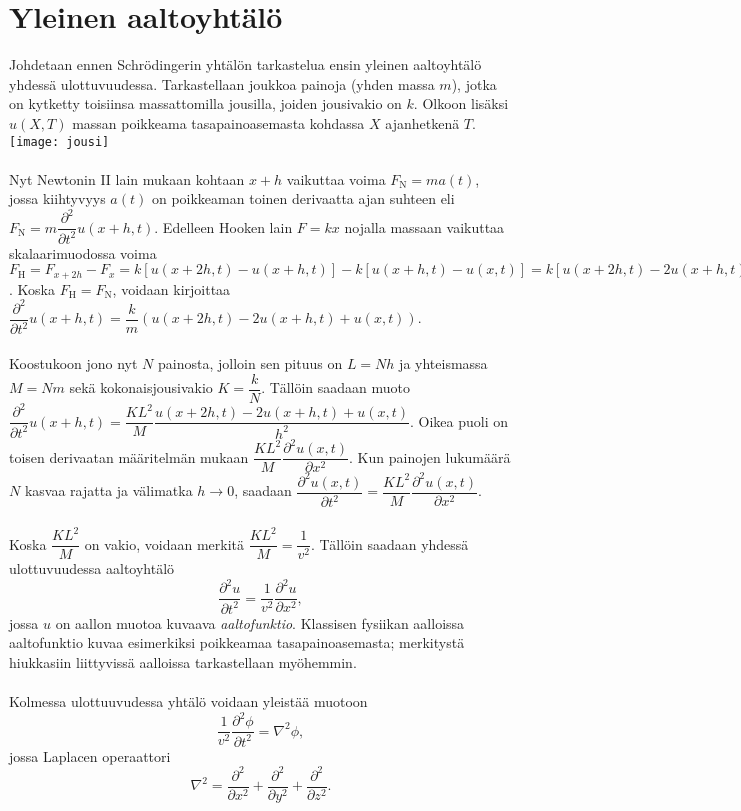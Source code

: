 \documentclass{article}
\begin{document}
\section{Yleinen aaltoyhtälö}
Johdetaan ennen Schrödingerin yhtälön tarkastelua ensin yleinen aaltoyhtälö yhdessä ulottuvuudessa. Tarkastellaan joukkoa painoja (yhden massa \(m\)), jotka on kytketty toisiinsa massattomilla jousilla, joiden jousivakio on \(k\). Olkoon lisäksi \(u(X, T)\) massan poikkeama tasapainoasemasta kohdassa \(X\) ajanhetkenä \(T\).\\
 \texttt{[image: jousi]}
 \\
 \\
Nyt Newtonin II lain mukaan kohtaan \(x+h\) vaikuttaa voima \(F_\text{N}=ma(t)\), jossa kiihtyvyys \(a(t)\) on poikkeaman toinen derivaatta ajan suhteen eli \(F_\text{N}=m\dfrac{\partial ^2}{\partial t^2} u(x+h, t)\). Edelleen Hooken lain \(F=kx\) nojalla massaan vaikuttaa skalaarimuodossa voima \(F_\text{H}=F_{x+2h}-F_x =k[u(x+2h, t)-u(x+h, t)]-k[u(x+h, t) - u(x, t)]=k[u(x+2h, t) - 2u(x+h, t) + u(x, t)]\). Koska \(F_\text{H}=F_\text{N}\), voidaan kirjoittaa \(\dfrac{\partial ^2}{\partial t^2}u(x+h, t)=\dfrac{k}{m}(u(x+2h, t)-2u(x+h, t)+u(x, t))\).\\
 \\
Koostukoon jono nyt \(N\) painosta, jolloin sen pituus on \(L=Nh\) ja yhteismassa \(M=Nm\) sekä kokonaisjousivakio \(K=\dfrac{k}{N}\). Tällöin saadaan muoto \(\dfrac{\partial ^2}{\partial t^2} u(x+h, t)=\dfrac{KL^2}{M} \dfrac{u(x+2h, t)-2u(x+h, t)+u(x, t)}{h^2}\). Oikea puoli on toisen derivaatan määritelmän mukaan \(\dfrac{KL^2}{M}\dfrac{\partial ^2 u(x, t)}{\partial x^2}\). Kun painojen lukumäärä \(N\) kasvaa rajatta ja välimatka \(h\to 0\), saadaan \(\dfrac{\partial ^2 u(x, t)}{\partial t^2}=\dfrac{KL^2}{M}\dfrac{\partial ^2 u(x, t)}{\partial x^2}\).\\
 \\
Koska \(\dfrac{KL^2}{M}\) on vakio, voidaan merkitä \(\dfrac{KL^2}{M}=\dfrac{1}{v^2}\). Tällöin saadaan yhdessä ulottuvuudessa aaltoyhtälö $$\dfrac{\partial ^2u}{\partial t^2}=\dfrac{1}{v^2} \dfrac{\partial ^2 u}{\partial x^2},$$ jossa \(u\) on aallon muotoa kuvaava \textit{aaltofunktio}. Klassisen fysiikan aalloissa aaltofunktio kuvaa esimerkiksi poikkeamaa tasapainoasemasta; merkitystä hiukkasiin liittyvissä aalloissa tarkastellaan myöhemmin.\\
 \\
Kolmessa ulottuuvudessa yhtälö voidaan yleistää muotoon $$\dfrac{1}{v^2}\dfrac{\partial ^2 \phi}{\partial t^2}=\nabla ^2 \phi,$$ jossa Laplacen operaattori $$\nabla ^2=\dfrac{\partial ^2}{\partial x^2}+\dfrac{\partial ^2}{\partial y^2}+\dfrac{\partial ^2}{\partial z^2}.$$
\end{document}
